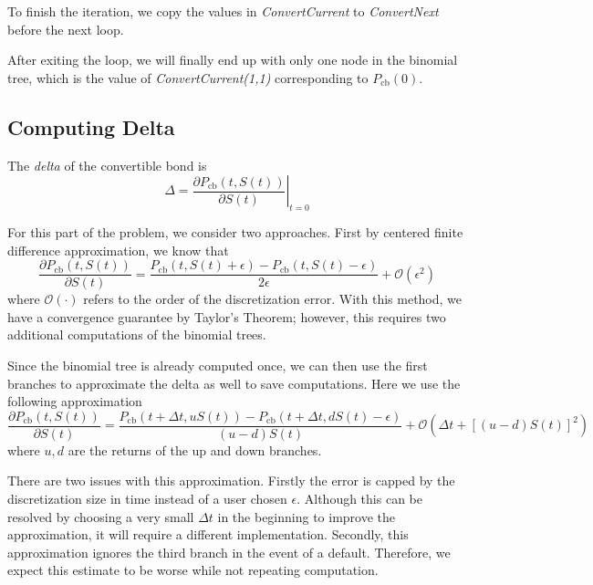 \documentclass[11pt]{article}
\theoremstyle{definition}
\begin{document}
To finish the iteration, we copy the values in 
\emph{ConvertCurrent} to \emph{ConvertNext} 
before the next loop.

After exiting the loop,
we will finally end up with only one node in the 
binomial tree,
which is the value of \emph{ConvertCurrent(1,1)}
corresponding to $P_\text{cb}(0)$.








\subsection{Computing Delta}

The \emph{delta} of the convertible bond is 
%
\begin{equation*}
  \Delta = \left. \frac{\partial P_\text{cb}(t,S(t)) }{\partial S(t)}
  \right|_{t=0}
\end{equation*}

For this part of the problem, we consider two approaches. 
First by centered finite difference approximation, 
we know that
%
\begin{equation} \label{cfd}
  \frac{\partial P_\text{cb}(t,S(t)) }{\partial S(t)}
  = \frac{P_\text{cb}(t,S(t) + \epsilon) - 
          P_\text{cb}(t,S(t)-\epsilon)}{2\epsilon}
    + \mathcal{O}(\epsilon ^ 2)
\end{equation}
%
where $\mathcal{O}(\cdot)$ refers to the order of 
the discretization error.
With this method, we have a 
convergence guarantee by Taylor's Theorem;
however, this requires two additional computations 
of the binomial trees.

Since the binomial tree is already computed once,
we can then use the first branches to approximate the delta as well
to save computations. Here we use the following approximation
%
\begin{equation} \label{bino_cfd}
  \frac{\partial P_\text{cb}(t,S(t)) }{\partial S(t)}
  = \frac{P_\text{cb}(t + \Delta t, u S(t) ) - 
        P_\text{cb}(t + \Delta t, d S(t)-\epsilon)}{
        (u-d)S(t)}
    + \mathcal{O}\left(\Delta t + [(u-d)S(t)]^2\right)
\end{equation}
%
where $u,d$ are the returns of the up and down branches.

There are two issues with this approximation.
Firstly the error is capped by the discretization size in time
instead of a user chosen $\epsilon$.
Although this can be resolved by choosing a very small 
$\Delta t$ in the beginning to improve the approximation,
it will require a different implementation.
Secondly, this approximation ignores the third branch 
in the event of a default.
Therefore, we expect this estimate to be worse
while not repeating computation.
\end{document}
